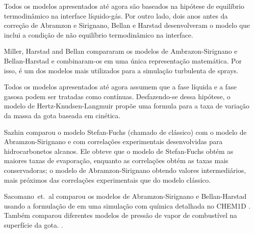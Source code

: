 Todos os modelos apresentados até agora são baseados na hipótese de equilíbrio termodinâmico na interface líquido-gás.
Por outro lado, dois anos antes da correção de Abramzon e Sirignano, Bellan e Harstad \cite{BellanJ1987} desenvolveram o modelo que inclui a condição de não equilíbrio termodinâmico na interface.

Miller, Harstad and Bellan \cite{MillerR1998} compararam os modelos de Ambrazon-Sirignano e Bellan-Harstad e combinaram-os em uma única representação matemática.
Por isso, é um dos modelos mais utilizados para a simulação turbulenta de sprays.  

Todos os modelos apresentados até agora assumem que a fase líquida e a fase gasosa podem ser tratadas como contínuas.
Desfazendo-se dessa hipótese, o modelo de Hertz-Knudsen-Langmuir  propõe uma formula para a taxa de variação da massa da gota baseada em cinética.

Sazhin \cite{Sazhin2006} comparou o modelo Stefan-Fuchs (chamado de clássico) com o modelo de Abramzon-Sirignano e com correlações experimentais desenvolvidas para hidrocarbonetos alcanos.
Ele obteve que o modelo de Stefan-Fuchs obtém as maiores taxas de evaporação, enquanto as correlações obtém as taxas mais conservadoras; o modelo de Abramzon-Sirignano obtendo valores intermediários, mais próximos das correlações experimentais que do modelo clássico.

Sacomano~et.~al \cite{SacomanoF2019IJHMT} comparou os modelos de Abramzon-Sirignano e Bellan-Harstad usando a formulação de \cite{MillerR1998} em uma simulação com química detalhada no CHEM1D \cite{Sommers1994PhD}.
Também comparou diferentes modelos de pressão de vapor de combustível na superfície da gota.
 .